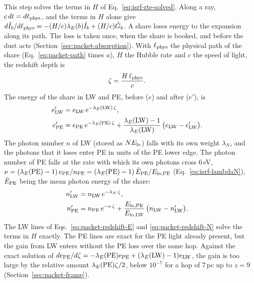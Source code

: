 This step solves the terms in $H$ of Eq.~\eqref{eq:isrf-rte-solved}. Along a
ray, $c\,dt=d\ell_{\rm phys}$, and the terms in $H$ alone give
$d\hat I_b/d\ell_{\rm phys}=-(H/c)\lambda_E(b)\hat I_b+(H/c)\hat G_b$. A share
loses energy to the expansion along its path. The loss is taken once, when the
share is booked, and before the dust acts (Section~\ref{sec:packet-absorption}).
With $\ell_{\rm phys}$ the physical path of the share
(Eq.~\eqref{eq:packet-path} times $a$), $H$ the Hubble rate and $c$ the speed
of light, the redshift depth is
\begin{equation}
  \zeta = \frac{H\,\ell_{\rm phys}}{c}.
  \label{eq:packet-zeta}
\end{equation}
The energy of the share in LW and PE, before ($e$) and after ($e'$), is
\begin{align}
  e'_{\rm LW} &= e_{\rm LW}\,e^{-\lambda_E({\rm LW})\,\zeta}, \nonumber\\
  e'_{\rm PE} &= e_{\rm PE}\,e^{-\lambda_E({\rm PE})\,\zeta}
    + \frac{\lambda_E({\rm LW})-1}{\lambda_E({\rm LW})}\,
      \big(e_{\rm LW}-e'_{\rm LW}\big).
  \label{eq:packet-redshift-E}
\end{align}
The photon number $n$ of LW (stored as $N E_{\rm lo}$) falls with its own
weight $\lambda_N$, and the photons that it loses enter PE in units of the PE
lower edge. The photon number of PE falls at the rate with which its own
photons cross $6$\,eV, $\nu=(\lambda_E({\rm PE})-1)\,e_{\rm PE}/n_{\rm PE}
=(\lambda_E({\rm PE})-1)\,\bar E_{\rm PE}/E_{{\rm lo},{\rm PE}}$
(Eq.~\eqref{eq:isrf-lambdaN}), $\bar E_{\rm PE}$ being the mean photon energy
of the share:
\begin{align}
  n'_{\rm LW} &= n_{\rm LW}\,e^{-\lambda_N\,\zeta}, \nonumber\\
  n'_{\rm PE} &= n_{\rm PE}\,e^{-\nu\,\zeta}
    + \frac{E_{{\rm lo},{\rm PE}}}{E_{{\rm lo},{\rm LW}}}\,
      \big(n_{\rm LW}-n'_{\rm LW}\big).
  \label{eq:packet-redshift-N}
\end{align}
The LW lines of Eqs.~\eqref{eq:packet-redshift-E} and
\eqref{eq:packet-redshift-N} solve the terms in $H$ exactly. The PE lines are
exact for the PE light already present, but the gain from LW enters without the
PE loss over the same hop. Against the exact solution of
$de_{\rm PE}/d\zeta=-\lambda_E({\rm PE})e_{\rm PE}+(\lambda_E({\rm LW})-1)e_{\rm LW}$,
the gain is too large by the relative amount $\lambda_E({\rm PE})\zeta/2$,
below $10^{-7}$ for a hop of $7$\,pc up to $z=9$
(Section~\ref{sec:packet-frame}).

